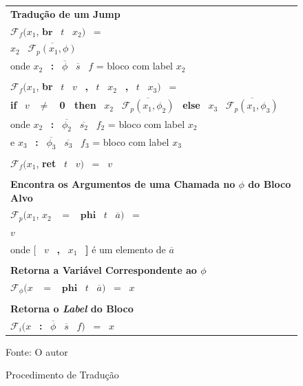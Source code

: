 \begin{figure}[H]
\begin{tabular}{ l }
    \textbf{Tradução de um Jump} \\
    $\mathcal{F}_f(x_1$, $\textbf{br}$ \ $t$ \ $x_2)$ \ = \\
    \qquad $x_2$ \ $\overline{\mathcal{F}_p(x_1, \phi)}$ \\
    \qquad onde $x_2$ \ \textbf{:} \ $\overline{\phi}$ \ $\overline{s}$ \ $f$ = bloco com label $x_2$ \\ \\
    $\mathcal{F}_f(x_1$, \textbf{br} \ $t$ \ $v$ \ \textbf{,} \ $t$ \ $x_2$ \ \textbf{,} \ $t$ \ $x_3)$ \ = \\
    \qquad \textbf{if} \ $v$ \ \textbf{$\boldsymbol{\neq}$ \ 0 \ then} \ $x_2$ \ $\overline{\mathcal{F}_p(x_1, \phi_2)}$ \ \textbf{else} \ $x_3$ \ $\overline{\mathcal{F}_p(x_1, \phi_3)}$ \\
    \qquad onde $x_2$ \ \textbf{:} \ $\overline{\phi_2}$ \ $\overline{s_2}$ \ $f_2$ = bloco com label $x_2$ \\
    \enspace \quad \qquad e $x_3$ \ \textbf{:} \ $\overline{\phi_3}$ \ $\overline{s_3}$ \ $f_3$ = bloco com label $x_3$ \\ \\
    $\mathcal{F}_f(x_1$, \textbf{ret} \ $t$ \ $v)$ \ = \ $v$ \\ \\
    \textbf{Encontra os Argumentos de uma Chamada no $\phi$ do Bloco Alvo} \\
    $\mathcal{F}_p(x_1$, $x_2$ \ $\boldsymbol{=}$ \ $\textbf{phi}$ \ $t$ \ $\overline{a})$ \ = \\
    \qquad $v$ \\
    \qquad onde $\textbf{[}$ \ $v$ \ \textbf{,} \ $x_1$ \ \textbf{]} é um elemento de $\overline{a}$ \\ \\
    \textbf{Retorna a Variável Correspondente ao $\phi$} \\
    $\mathcal{F}_\phi(x$ \ $\boldsymbol{=}$ \ $\textbf{phi}$ \ $t$ \ $\overline{a})$ \ = \ $x$ \\ \\
    \textbf{Retorna o \emph{Label} do Bloco} \\
    $\mathcal{F}_i(x$ \ \textbf{:} \ $\overline{\phi}$ \ $\overline{s}$ \ $f)$ \ = \ $x$ \\
    \end{tabular}
    \begin{center}
    \caption{Procedimento de Tradução}
    \label{fig:traducao}
    \small{Fonte: O autor}
    \end{center}
\end{figure}

